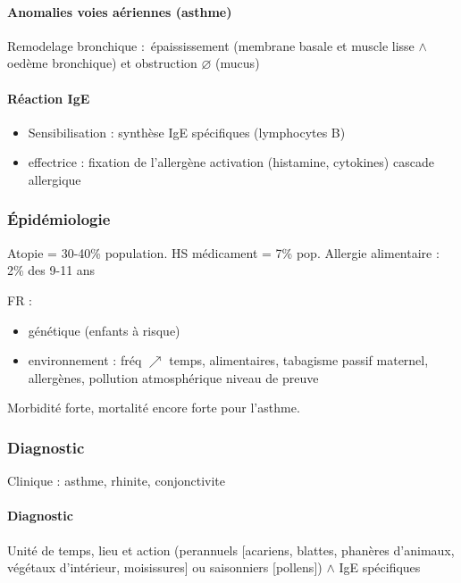 \documentclass[11pt]{article}
\begin{document}
\paragraph{Anomalies voies aériennes (asthme)}
\label{sec:org3773478}
Remodelage bronchique : épaississement (membrane basale et muscle lisse \(\wedge\) oedème
bronchique) et obstruction \(\diameter\) (mucus)

\paragraph{Réaction IgE}
\label{sec:org21a6090}

\begin{itemize}
\item Sensibilisation : synthèse IgE spécifiques (lymphocytes B)
\item effectrice : fixation de l'allergène \thus activation (histamine,
cytokines) \thus cascade allergique
\end{itemize}


\subsubsection{Épidémiologie}
\label{sec:org7aa0e73}
Atopie = 30-40\% population. HS médicament = 7\% pop. Allergie alimentaire : 2\%
des 9-11 ans

FR : 

\begin{itemize}
\item génétique (enfants à risque)
\item environnement : fréq \(\nearrow\) temps, alimentaires, tabagisme passif
maternel, allergènes, pollution atmosphérique \danger niveau de preuve
\end{itemize}

Morbidité forte, mortalité encore forte pour l'asthme.

\subsubsection{Diagnostic}
\label{sec:orgec6d93c}
Clinique : asthme, rhinite, conjonctivite

\paragraph{Diagnostic}
\label{sec:org9ca0131}
Unité de temps, lieu et action (perannuels [acariens,
blattes, phanères d'animaux, végétaux d'intérieur, moisissures] ou saisonniers
[pollens]) \(\wedge\) IgE spécifiques
\end{document}
